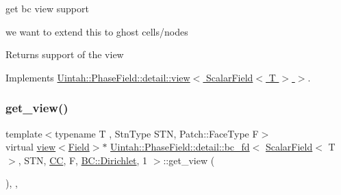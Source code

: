 get bc view support 

we want to extend this to ghost cells/nodes

\begin{DoxyReturn}{Returns}
support of the view 
\end{DoxyReturn}


Implements \hyperlink{classUintah_1_1PhaseField_1_1detail_1_1view_3_01ScalarField_3_01T_01_4_01_4_a3e14b0c7a57a57707bb33954861ab1c1}{Uintah\+::\+Phase\+Field\+::detail\+::view$<$ Scalar\+Field$<$ T $>$ $>$}.

\mbox{\label{classUintah_1_1PhaseField_1_1detail_1_1bc__fd_3_01ScalarField_3_01T_01_4_00_01STN_00_01CC_00_01Fa77b2fd7fb77d0a4dc6c86c68d4ea0bc_ab7b39dfca20ca18356b1a72ae055e99f}} 
\subsubsection{\texorpdfstring{get\+\_\+view()}{get\_view()}\hspace{0.1cm}{\footnotesize\ttfamily [1/2]}}
{\footnotesize\ttfamily template$<$typename T , Stn\+Type S\+TN, Patch\+::\+Face\+Type F$>$ \\
virtual \hyperlink{classUintah_1_1PhaseField_1_1detail_1_1view}{view}$<$\hyperlink{structUintah_1_1PhaseField_1_1ScalarField}{Field}$>$$\ast$ \hyperlink{classUintah_1_1PhaseField_1_1detail_1_1bc__fd}{Uintah\+::\+Phase\+Field\+::detail\+::bc\+\_\+fd}$<$ \hyperlink{structUintah_1_1PhaseField_1_1ScalarField}{Scalar\+Field}$<$ T $>$, S\+TN, \hyperlink{namespaceUintah_1_1PhaseField_a33d355affda78a83f45755ba8388cedda22303704507d024d1d6508ed9859a85a}{CC}, F, \hyperlink{namespaceUintah_1_1PhaseField_a148fba372aa3be96fd6eede7a2fa10b5abac152b762896edff34ed668ae1a546f}{B\+C\+::\+Dirichlet}, 1 $>$\+::get\+\_\+view (\begin{DoxyParamCaption}{ }\end{DoxyParamCaption})\hspace{0.3cm}{\ttfamily [inline]}, {\ttfamily [override]}, {\ttfamily [virtual]}}




